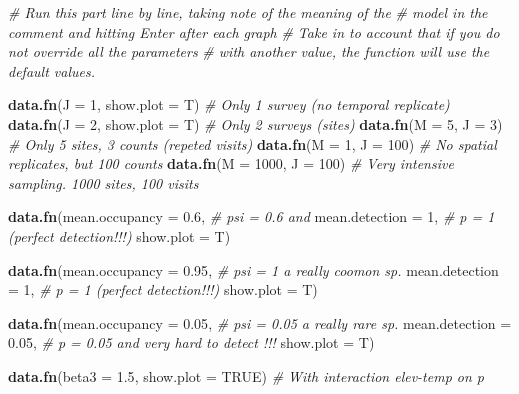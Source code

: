 \documentclass[]{book}
\newenvironment{Shaded}{\begin{snugshade}}{\end{snugshade}}
\newcommand{\KeywordTok}[1]{\textcolor[rgb]{0.13,0.29,0.53}{\textbf{{#1}}}}
\newcommand{\DataTypeTok}[1]{\textcolor[rgb]{0.13,0.29,0.53}{{#1}}}
\newcommand{\DecValTok}[1]{\textcolor[rgb]{0.00,0.00,0.81}{{#1}}}
\newcommand{\FloatTok}[1]{\textcolor[rgb]{0.00,0.00,0.81}{{#1}}}
\newcommand{\CommentTok}[1]{\textcolor[rgb]{0.56,0.35,0.01}{\textit{{#1}}}}
\newcommand{\OtherTok}[1]{\textcolor[rgb]{0.56,0.35,0.01}{{#1}}}
\newcommand{\NormalTok}[1]{{#1}}
\begin{document}
\begin{Shaded}
\begin{Highlighting}[]
\CommentTok{# Run this part line by line, taking note of the meaning of the }
\CommentTok{# model in the comment and hitting Enter after each graph}
\CommentTok{# Take in to account that if you do not override all the parameters}
\CommentTok{# with another value, the function will use the default values.}

\KeywordTok{data.fn}\NormalTok{(}\DataTypeTok{J =} \DecValTok{1}\NormalTok{, }\DataTypeTok{show.plot =} \NormalTok{T)  }\CommentTok{# Only 1 survey (no temporal replicate)}
\KeywordTok{data.fn}\NormalTok{(}\DataTypeTok{J =} \DecValTok{2}\NormalTok{, }\DataTypeTok{show.plot =} \NormalTok{T)  }\CommentTok{# Only 2 surveys (sites)}
\KeywordTok{data.fn}\NormalTok{(}\DataTypeTok{M =} \DecValTok{5}\NormalTok{, }\DataTypeTok{J =} \DecValTok{3}\NormalTok{)          }\CommentTok{# Only 5 sites, 3 counts (repeted visits)}
\KeywordTok{data.fn}\NormalTok{(}\DataTypeTok{M =} \DecValTok{1}\NormalTok{, }\DataTypeTok{J =} \DecValTok{100}\NormalTok{)        }\CommentTok{# No spatial replicates, but 100 counts}
\KeywordTok{data.fn}\NormalTok{(}\DataTypeTok{M =} \DecValTok{1000}\NormalTok{, }\DataTypeTok{J =} \DecValTok{100}\NormalTok{)     }\CommentTok{# Very intensive sampling. 1000 sites, 100 visits}

\KeywordTok{data.fn}\NormalTok{(}\DataTypeTok{mean.occupancy =} \FloatTok{0.6}\NormalTok{,   }\CommentTok{# psi = 0.6 and}
        \DataTypeTok{mean.detection =} \DecValTok{1}\NormalTok{,     }\CommentTok{# p = 1 (perfect detection!!!)}
        \DataTypeTok{show.plot =} \NormalTok{T)}

\KeywordTok{data.fn}\NormalTok{(}\DataTypeTok{mean.occupancy =} \FloatTok{0.95}\NormalTok{,  }\CommentTok{# psi = 1 a really coomon sp.}
        \DataTypeTok{mean.detection =} \DecValTok{1}\NormalTok{,     }\CommentTok{# p = 1 (perfect detection!!!)}
        \DataTypeTok{show.plot =} \NormalTok{T)}

\KeywordTok{data.fn}\NormalTok{(}\DataTypeTok{mean.occupancy =} \FloatTok{0.05}\NormalTok{,  }\CommentTok{# psi = 0.05 a really rare sp.}
        \DataTypeTok{mean.detection =} \FloatTok{0.05}\NormalTok{,  }\CommentTok{# p = 0.05 and very hard to detect !!!}
        \DataTypeTok{show.plot =} \NormalTok{T)}

\KeywordTok{data.fn}\NormalTok{(}\DataTypeTok{beta3 =} \FloatTok{1.5}\NormalTok{, }\DataTypeTok{show.plot =} \OtherTok{TRUE}\NormalTok{) }\CommentTok{# With interaction elev-temp on p}


\end{Highlighting}
\end{Shaded}
\end{document}

